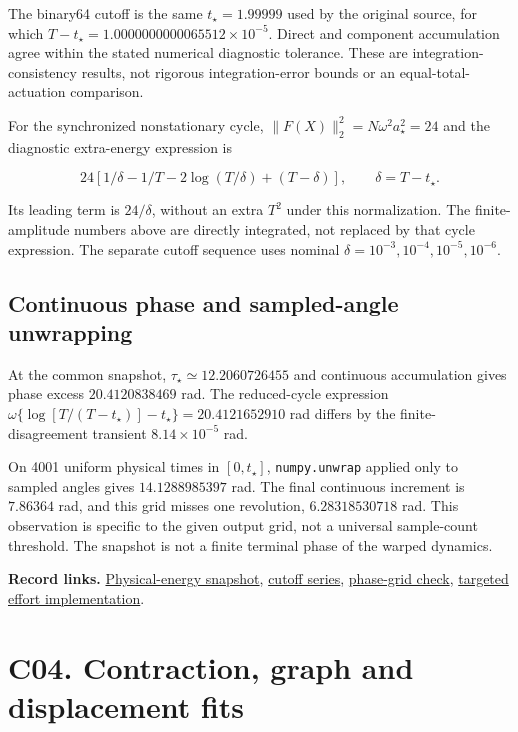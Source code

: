 \documentclass[11pt,a4paper]{article}
\begin{document}
The binary64 cutoff is the same \(t_\star=1.99999\) used by the original
source, for which \(T-t_\star=1.0000000000065512\times10^{-5}\). Direct
and component accumulation agree within the stated numerical diagnostic
tolerance. These are integration-consistency results, not rigorous
integration-error bounds or an equal-total-actuation comparison.

For the synchronized nonstationary cycle,
\(\|F(X)\|_2^2=N\omega^2a_\star^2=24\) and the diagnostic extra-energy
expression is

\[
24[1/\delta-1/T-2\log(T/\delta)+(T-\delta)],\qquad \delta=T-t_\star.
\]

Its leading term is \(24/\delta\), without an extra \(T^2\) under this
normalization. The finite-amplitude numbers above are directly
integrated, not replaced by that cycle expression. The separate cutoff
sequence uses nominal \(\delta=10^{-3},10^{-4},10^{-5},10^{-6}\).

\subsection{Continuous phase and sampled-angle
unwrapping}\label{c03-phase}

At the common snapshot, \(\tau_\star\simeq12.2060726455\) and continuous
accumulation gives phase excess \(20.4120838469\) rad. The reduced-cycle
expression \(\omega\{\log[T/(T-t_\star)]-t_\star\}=20.4121652910\) rad
differs by the finite-disagreement transient \(8.14\times10^{-5}\) rad.

On 4001 uniform physical times in \([0,t_\star]\), \texttt{numpy.unwrap}
applied only to sampled angles gives \(14.1288985397\) rad. The final
continuous increment is \(7.86364\) rad, and this grid misses one
revolution, \(6.28318530718\) rad. This observation is specific to the
given output grid, not a universal sample-count threshold. The snapshot
is not a finite terminal phase of the warped dynamics.

\textbf{Record links.}
\href{../data/targeted_reference/effort/full_clock_snapshot.csv}{Physical-energy
snapshot},
\href{../data/targeted_reference/effort/full_clock_cutoff_series.csv}{cutoff
series},
\href{../data/targeted_reference/protocols/full_clock_phase_grid.csv}{phase-grid
check}, \href{../targeted/effort_reference.py}{targeted effort
implementation}.

\section{C04. Contraction, graph and displacement fits}\label{c04}
\end{document}
